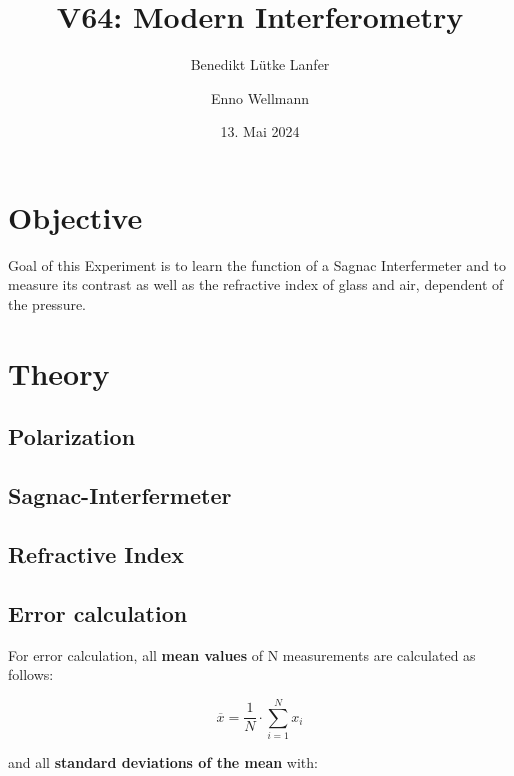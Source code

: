 

\title{V64: Modern Interferometry}
\author{Benedikt Lütke Lanfer \and Enno Wellmann}
\date{13. Mai 2024}
\publishers{TU Dortmund – Fakultät Physik}


% 
\maketitle
\tableofcontents
\newpage


% 
\section{Objective}
Goal of this Experiment is to learn the function of a Sagnac Interfermeter and to measure its contrast as well as the 
refractive index of glass and air, dependent of the pressure. 


\section{Theory}
\subsection{Polarization}

\subsection{Sagnac-Interfermeter}

\subsection{Refractive Index}

\subsection{Error calculation}
For error calculation, all \textbf{mean values} of N measurements are calculated as follows:

\begin{equation}
    \overline{x} = \frac{1}{N} \cdot \sum_{i=1}^N x_i
    \label{eqn:Mittelwert}
\end{equation}

and all \textbf{standard deviations of the mean} with:

